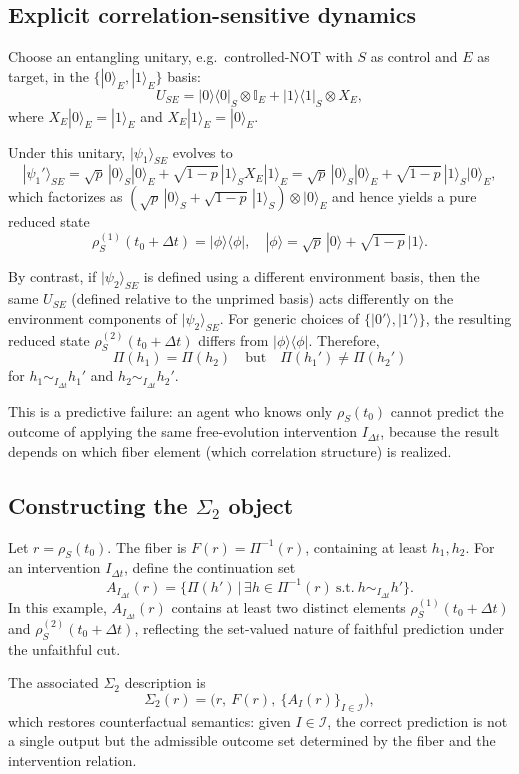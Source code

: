 \subsection{Explicit correlation-sensitive dynamics}

Choose an entangling unitary, e.g.\ controlled-NOT with $S$ as control and $E$ as target, in the
$\{|0\rangle_E,|1\rangle_E\}$ basis:
\[
  U_{SE} = |0\rangle\langle 0|_S \otimes \mathbb{I}_E + |1\rangle\langle 1|_S \otimes X_E,
\]
where $X_E|0\rangle_E=|1\rangle_E$ and $X_E|1\rangle_E=|0\rangle_E$.

Under this unitary, $|\psi_1\rangle_{SE}$ evolves to
\[
  |\psi_1'\rangle_{SE} = \sqrt{p}\,|0\rangle_S|0\rangle_E + \sqrt{1-p}\,|1\rangle_S X_E|1\rangle_E
  = \sqrt{p}\,|0\rangle_S|0\rangle_E + \sqrt{1-p}\,|1\rangle_S|0\rangle_E,
\]
which factorizes as $(\sqrt{p}\,|0\rangle_S+\sqrt{1-p}\,|1\rangle_S)\otimes|0\rangle_E$ and hence
yields a pure reduced state
\[
  \rho_S^{(1)}(t_0+\Delta t) = |\phi\rangle\langle\phi|,\quad |\phi\rangle=\sqrt{p}\,|0\rangle+\sqrt{1-p}\,|1\rangle.
\]

By contrast, if $|\psi_2\rangle_{SE}$ is defined using a different environment basis, then the
same $U_{SE}$ (defined relative to the unprimed basis) acts differently on the environment
components of $|\psi_2\rangle_{SE}$. For generic choices of $\{|0'\rangle,|1'\rangle\}$, the
resulting reduced state $\rho_S^{(2)}(t_0+\Delta t)$ differs from $|\phi\rangle\langle\phi|$.
Therefore,
\[
  \Pi(h_1)=\Pi(h_2)\quad\text{but}\quad
  \Pi(h_1') \neq \Pi(h_2')
\]
for $h_1 \sim_{I_{\Delta t}} h_1'$ and $h_2 \sim_{I_{\Delta t}} h_2'$.

This is a predictive failure: an agent who knows only $\rho_S(t_0)$ cannot predict the outcome
of applying the same free-evolution intervention $I_{\Delta t}$, because the result depends on
which fiber element (which correlation structure) is realized.

\subsection{Constructing the \texorpdfstring{$\Sigma_2$}{Sigma-2} object}

Let $r=\rho_S(t_0)$. The fiber is $F(r)=\Pi^{-1}(r)$, containing at least $h_1,h_2$.
For an intervention $I_{\Delta t}$, define the continuation set
\[
  A_{I_{\Delta t}}(r)
  = \Big\{ \Pi(h') \,\Big|\, \exists h\in \Pi^{-1}(r)\ \text{s.t.}\ h \sim_{I_{\Delta t}} h' \Big\}.
\]
In this example, $A_{I_{\Delta t}}(r)$ contains at least two distinct elements
$\rho_S^{(1)}(t_0+\Delta t)$ and $\rho_S^{(2)}(t_0+\Delta t)$, reflecting the set-valued nature of
faithful prediction under the unfaithful cut.

The associated $\Sigma_2$ description is
\[
  \Sigma_2(r) = \big(r,\ F(r),\ \{A_I(r)\}_{I\in\mathcal{I}}\big),
\]
which restores counterfactual semantics: given $I\in\mathcal{I}$, the correct prediction is not
a single output but the admissible outcome set determined by the fiber and the intervention
relation.